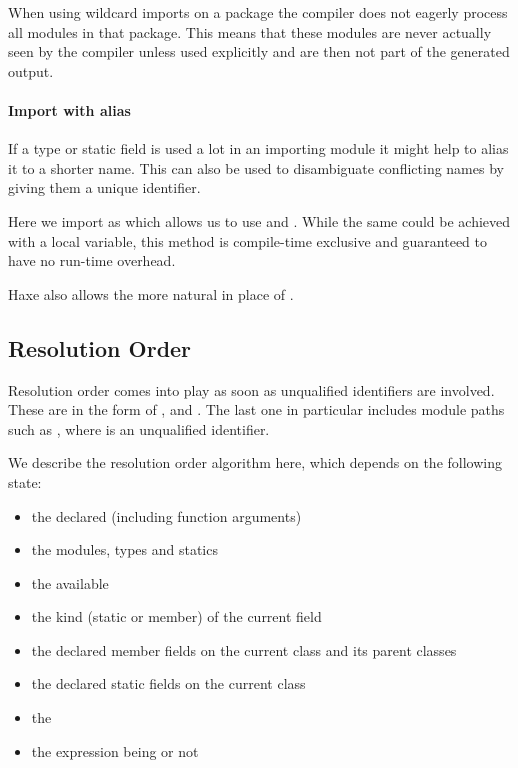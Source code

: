 When using wildcard imports on a package the compiler does not eagerly process all modules in that package. This means that these modules are never actually seen by the compiler unless used explicitly and are then not part of the generated output.

\paragraph{Import with alias}

If a type or static field is used a lot in an importing module it might help to alias it to a shorter name. This can also be used to disambiguate conflicting names by giving them a unique identifier.


Here we import  as  which allows us to use  and . While the same could be achieved with a local variable, this method is compile-time exclusive and guaranteed to have no run-time overhead.


Haxe also allows the more natural  in place of .


\subsection{Resolution Order}
\label{type-system-resolution-order}

Resolution order comes into play as soon as unqualified identifiers are involved. These are  in the form of ,  and . The last one in particular includes module paths such as , where  is an unqualified identifier.  

We describe the resolution order algorithm here, which depends on the following state:

\begin{itemize}
	\item the declared  (including function arguments)
	\item the  modules, types and statics
	\item the available 
	\item the kind (static or member) of the current field
	\item the declared member fields on the current class and its parent classes
	\item the declared static fields on the current class
	\item the 
	\item the expression being  or not
\end{itemize}

